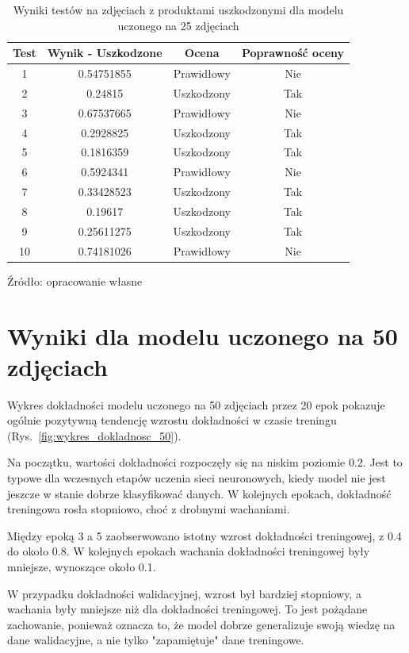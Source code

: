 \begin{table}[H]
\centering
\caption{Wyniki testów na zdjęciach z produktami uszkodzonymi dla modelu uczonego na 25 zdjęciach}
\begin{tabular}{|c|c|c|c|}
\hline
\textbf{Test} & \textbf{Wynik - Uszkodzone} & \textbf{Ocena} & \textbf{Poprawność oceny}  \\ \hline
1  & 0.54751855 & Prawidłowy & Nie  \\ \hline
2  & 0.24815 & Uszkodzony & Tak \\ \hline
3  & 0.67537665 & Prawidłowy & Nie \\ \hline
4  & 0.2928825 & Uszkodzony & Tak \\ \hline
5  & 0.1816359 & Uszkodzony & Tak \\ \hline
6  & 0.5924341 & Prawidłowy & Nie \\ \hline
7  & 0.33428523 & Uszkodzony & Tak \\ \hline
8  & 0.19617 & Uszkodzony & Tak \\ \hline
9  & 0.25611275 & Uszkodzony & Tak \\ \hline
10 & 0.74181026 & Prawidłowy & Nie \\ \hline
\end{tabular}
\begin{center}
\footnotesize{Źródło: opracowanie własne}
\end{center}
\label{tab:test_results_uszkodzone_25}
\end{table}

\section{Wyniki dla modelu uczonego na 50 zdjęciach}

Wykres dokładności modelu uczonego na 50 zdjęciach przez 20 epok pokazuje ogólnie pozytywną tendencję wzrostu dokładności w czasie treningu (Rys.~\ref{fig:wykres_dokladnosc_50}).

Na początku, wartości dokładności rozpoczęły się na niskim poziomie 0.2. Jest to typowe dla wczesnych etapów uczenia sieci neuronowych, kiedy model nie jest jeszcze w stanie dobrze klasyfikować danych. W kolejnych epokach, dokładność treningowa rosła stopniowo, choć z drobnymi wachaniami.

Między epoką 3 a 5 zaobserwowano istotny wzrost dokładności treningowej, z 0.4 do około 0.8. W kolejnych epokach wachania dokładności treningowej były mniejsze, wynoszące około 0.1.

W przypadku dokładności walidacyjnej, wzrost był bardziej stopniowy, a wachania były mniejsze niż dla dokładności treningowej. To jest pożądane zachowanie, ponieważ oznacza to, że model dobrze generalizuje swoją wiedzę na dane walidacyjne, a nie tylko "zapamiętuje" dane treningowe.

